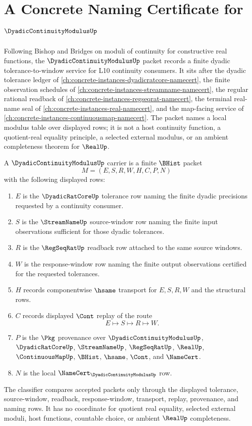 \chapter{A Concrete Naming Certificate for $\DyadicContinuityModulusUp$}
\label{ch:concrete-instances-dyadic-continuity-modulus-namecert}

Following Bishop and Bridges on moduli of continuity for constructive real functions, the $\DyadicContinuityModulusUp$ packet records a finite dyadic tolerance-to-window service for L10 continuity consumers. It sits after the dyadic tolerance ledger of \autoref{ch:concrete-instances-dyadicratcore-namecert}, the finite observation schedules of \autoref{ch:concrete-instances-streamname-namecert}, the regular rational readback of \autoref{ch:concrete-instances-regseqrat-namecert}, the terminal real-name seal of \autoref{ch:concrete-instances-real-namecert}, and the map-facing service of \autoref{ch:concrete-instances-continuousmap-namecert}. The packet names a local modulus table over displayed rows; it is not a host continuity function, a quotient-real equality principle, a selected external modulus, or an ambient completeness theorem for $\RealUp$.

\begin{definition}
\label{def:dyadic-continuity-modulus-carrier}
A $\DyadicContinuityModulusUp$ carrier is a finite $\BHist$ packet
$$
M=(E,S,R,W,H,C,P,N)
$$
with the following displayed rows:
\begin{enumerate}
\item $E$ is the $\DyadicRatCoreUp$ tolerance row naming the finite dyadic precisions requested by a continuity consumer.
\item $S$ is the $\StreamNameUp$ source-window row naming the finite input observations sufficient for those dyadic tolerances.
\item $R$ is the $\RegSeqRatUp$ readback row attached to the same source windows.
\item $W$ is the response-window row naming the finite output observations certified for the requested tolerances.
\item $H$ records componentwise $\hsame$ transport for $E,S,R,W$ and the structural rows.
\item $C$ records displayed $\Cont$ replay of the route
$$
E \longmapsto S \longmapsto R \longmapsto W .
$$
\item $P$ is the $\Pkg$ provenance over $\DyadicContinuityModulusUp$, $\DyadicRatCoreUp$, $\StreamNameUp$, $\RegSeqRatUp$, $\RealUp$, $\ContinuousMapUp$, $\BHist$, $\hsame$, $\Cont$, and $\NameCert$.
\item $N$ is the local $\NameCert_{\DyadicContinuityModulusUp}$ row.
\end{enumerate}
The classifier compares accepted packets only through the displayed tolerance, source-window, readback, response-window, transport, replay, provenance, and naming rows. It has no coordinate for quotient real equality, selected external moduli, host functions, countable choice, or ambient $\RealUp$ completeness.
\end{definition}

